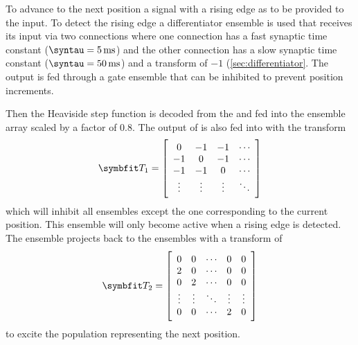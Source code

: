 To advance to the next position a signal with a rising edge as to be provided to the  input.
To detect the rising edge a differentiator ensemble is used that receives its input via two connections where one connection has a fast synaptic time constant ($\syntau = \SI{5}{\milli\second}$) and the other connection has a slow synaptic time constant ($\syntau = \SI{50}{\milli\second}$) and a transform of $-1$ (\cref{sec:differentiator}.
The output is fed through a gate ensemble that can be inhibited to prevent position increments.

Then the Heaviside step function is decoded from the  and fed into the  ensemble array scaled by a factor of \num{0.8}.
The output of  is also fed into  with the transform
\begin{equation}
    \mat T_1 = \sbr{\begin{array}{cccc}
        0 & -1 & -1 & \cdots \\
        -1 & 0 & -1 & \cdots \\
        -1 & -1 & 0 & \cdots \\
        \vdots & \vdots & \vdots & \ddots
    \end{array}}
\end{equation}
which will inhibit all ensembles except the one corresponding to the current position.
This ensemble will only become active when a rising edge is detected.
The  ensemble projects back to the  ensembles with a transform of
\begin{equation}
    \mat T_2 = \sbr{\begin{array}{ccccc}
        0 & 0 & \cdots & 0 & 0 \\
        2 & 0 & \cdots & 0 & 0 \\
        0 & 2 & \cdots & 0 & 0 \\
        \vdots & \vdots & \ddots & \vdots & \vdots \\
        0 & 0 & \cdots & 2 & 0
    \end{array}}
\end{equation}
to excite the population representing the next position.

